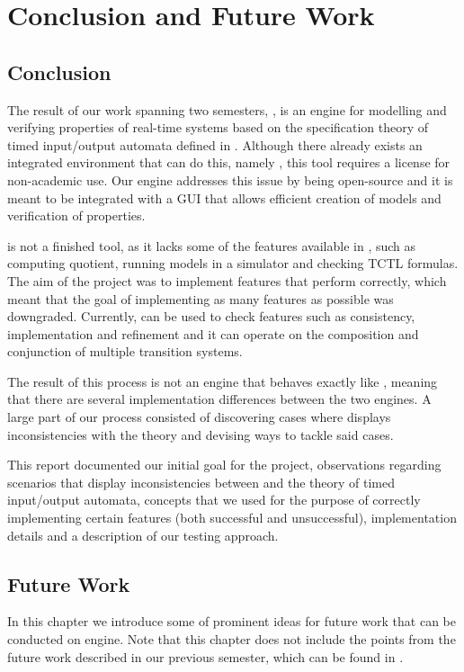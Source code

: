 \chapter{Conclusion and Future Work}

\section{Conclusion}\label{sec:conclusion}
The result of our work spanning two semesters, \jecdar, is an engine for modelling and verifying properties of real-time systems based on the specification theory of timed input/output automata defined in \textcite{David:2010}. Although there already exists an integrated environment that can do this, namely \ecdar, this tool requires a license for non-academic use. Our engine addresses this issue by being open-source and it is meant to be integrated with a GUI that allows efficient creation of models and verification of properties.

\jecdar is not a finished tool, as it lacks some of the features available in \ecdar, such as computing quotient, running models in a simulator and checking TCTL formulas. The aim of the project was to implement features that perform correctly, which meant that the goal of implementing as many features as possible was downgraded. Currently, \jecdar can be used to check features such as consistency, implementation and refinement and it can operate on the composition and conjunction of multiple transition systems.

The result of this process is not an engine that behaves exactly like \ecdar, meaning that there are several implementation differences between the two engines. A large part of our process consisted of discovering cases where \ecdar displays inconsistencies with the theory and devising ways to tackle said cases.

This report documented our initial goal for the project, observations regarding scenarios that display inconsistencies between \ecdar and the theory of timed input/output automata, concepts that we used for the purpose of correctly implementing certain features (both successful and unsuccessful), implementation details and a description of our testing approach.

\section{Future Work}\label{sec:future}
In this chapter we introduce some of prominent ideas for future work that can be conducted on \jecdar engine. Note that this chapter does not include the points from the future work described in our previous semester, which can be found in \textcite{Jecdar:2019}.


